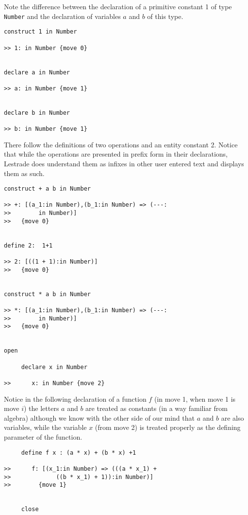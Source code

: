 \documentclass{article}
\begin{document}
Note the difference between the declaration of a primitive constant 1 of type {\tt Number} and the declaration of variables $a$ and $b$ of this type.

\begin{verbatim}
construct 1 in Number

>> 1: in Number {move 0}


declare a in Number

>> a: in Number {move 1}


declare b in Number

>> b: in Number {move 1}
\end{verbatim}

There follow the definitions of two operations and an entity constant 2.  Notice that while
the operations are presented in prefix form in their declarations, Lestrade does understand them
as infixes in other user entered text and displays them as such.

\begin{verbatim}
construct + a b in Number

>> +: [(a_1:in Number),(b_1:in Number) => (---:
>>        in Number)]
>>   {move 0}


define 2:  1+1

>> 2: [((1 + 1):in Number)]
>>   {move 0}


construct * a b in Number

>> *: [(a_1:in Number),(b_1:in Number) => (---:
>>        in Number)]
>>   {move 0}


open

     declare x in Number

>>      x: in Number {move 2}
\end{verbatim}

Notice in the following  declaration of a function $f$ (in move 1, when move 1 is move $i$) the letters $a$ and $b$ are treated as constants (in a way familiar from algebra) although we know with the other side of our mind that $a$ and $b$ are also variables, while the variable $x$ (from move 2) is treated properly as the defining parameter of the function.

\begin{verbatim}
     define f x : (a * x) + (b * x) +1

>>      f: [(x_1:in Number) => (((a * x_1) + 
>>             ((b * x_1) + 1)):in Number)]
>>        {move 1}


     close

\end{verbatim}
\end{document}
